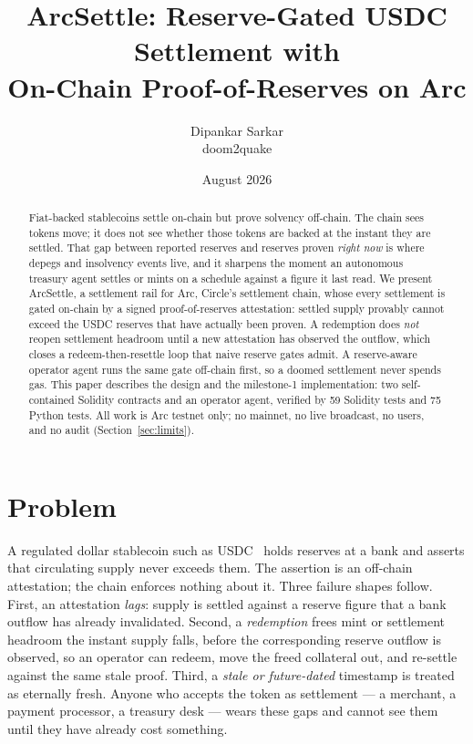 \documentclass[11pt]{article}
\title{ArcSettle: Reserve-Gated USDC Settlement with\\ On-Chain Proof-of-Reserves on Arc}
\author{Dipankar Sarkar \\ \small doom2quake}
\date{August 2026}
\begin{document}
\maketitle

\begin{abstract}
Fiat-backed stablecoins settle on-chain but prove solvency off-chain. The chain sees
tokens move; it does not see whether those tokens are backed at the instant they are
settled. That gap between reported reserves and reserves proven \emph{right now} is
where depegs and insolvency events live, and it sharpens the moment an autonomous
treasury agent settles or mints on a schedule against a figure it last read. We present
ArcSettle, a settlement rail for Arc, Circle's settlement chain, whose every settlement
is gated on-chain by a signed proof-of-reserves attestation: settled supply provably
cannot exceed the USDC reserves that have actually been proven. A redemption does
\emph{not} reopen settlement headroom until a new attestation has observed the outflow,
which closes a redeem-then-resettle loop that naive reserve gates admit. A reserve-aware
operator agent runs the same gate off-chain first, so a doomed settlement never spends
gas. This paper describes the design and the milestone-1 implementation: two
self-contained Solidity contracts and an operator agent, verified by 59 Solidity tests
and 75 Python tests. All work is Arc testnet only; no mainnet, no live broadcast, no
users, and no audit (Section~\ref{sec:limits}).
\end{abstract}

\section{Problem}
A regulated dollar stablecoin such as USDC~\cite{usdc} holds reserves at a bank and
asserts that circulating supply never exceeds them. The assertion is an off-chain
attestation; the chain enforces nothing about it. Three failure shapes follow. First,
an attestation \emph{lags}: supply is settled against a reserve figure that a bank
outflow has already invalidated. Second, a \emph{redemption} frees mint or settlement
headroom the instant supply falls, before the corresponding reserve outflow is observed,
so an operator can redeem, move the freed collateral out, and re-settle against the same
stale proof. Third, a \emph{stale or future-dated} timestamp is treated as eternally
fresh. Anyone who accepts the token as settlement --- a merchant, a payment processor, a
treasury desk --- wears these gaps and cannot see them until they have already cost
something.
\end{document}
